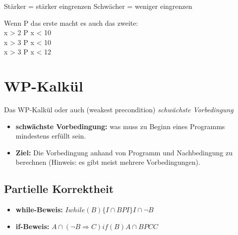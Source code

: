 Stärker = stärker eingrenzen
Schwächer = weniger eingrenzen 

Wenn P das erste macht es auch das zweite:\\
x > 2 {P} x < 10\\
x > 3 {P} x < 10\\
x > 3 {P} x < 12\\

\section{WP-Kalkül}

Das WP-Kalkül oder auch (weakest precondition) \textit{schwächste Vorbedingung}\\

\begin{itemize}
\item \textbf{schwächste Vorbedingung:} was muss zu Beginn eines Programms mindestens erfüllt sein.
\item \textbf{Ziel:} Die Vorbedingung anhand von Programm und Nachbedingung zu berechnen (Hinweis: es gibt meist mehrere Vorbedingungen). 
\end{itemize}

\subsection{Partielle Korrektheit}

\begin{itemize}
\item \textbf{while-Beweis:} $I while(B)  \{ I \cap B P I \} I \cap \lnot B$
\item \textbf{if-Beweis:} $A \cap (\lnot B \Rightarrow	C ) \textit{if}(B){A \cap B P C} C$
\end{itemize}










